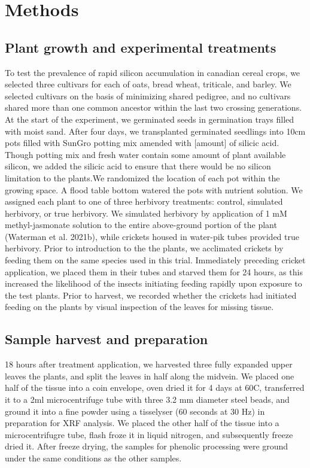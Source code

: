 \documentclass[12pt, letterpaper, ]{report}
\begin{document}
\section{Methods}

\subsection{Plant growth and experimental treatments}

To test the prevalence of rapid silicon accumulation in canadian cereal crops, we selected three cultivars for each of oats, bread wheat, triticale, and barley. We selected cultivars on the basis of minimizing shared pedigree, and no cultivars shared more than one common ancestor within the last two crossing generations. At the start of the experiment, we germinated seeds in germination trays filled with moist sand. After four days, we transplanted germinated seedlings into 10cm pots filled with SunGro potting mix amended with [amount] of silicic acid. Though potting mix and fresh water contain some amount of plant available silicon, we added the silicic acid to ensure that there would be no silicon limitation to the plants.We randomized the location of each pot within the growing space. A flood table bottom watered the pots with nutrient solution. We assigned each plant to one of three herbivory treatments: control, simulated herbivory, or true herbivory. We simulated herbivory by application of 1 mM methyl-jasmonate solution to the entire above-ground portion of the plant (Waterman et al. 2021b), while crickets housed in water-pik tubes provided true herbivory. Prior to introduction to the the plants, we acclimated crickets by feeding them on the same species used in this trial. Immediately preceding cricket application, we placed them in their tubes and starved them for 24 hours, as this increased the likelihood of the insects initiating feeding rapidly upon exposure to the test plants. Prior to harvest, we recorded whether the crickets had initiated feeding on the plants by visual inspection of the leaves for missing tissue. 

\subsection{Sample harvest and preparation}

18 hours after treatment application, we harvested three fully expanded upper leaves the plants, and split the leaves in half along the midvein. We placed one half of the tissue into a coin envelope, oven dried it for 4 days at 60\degree C, transferred it to a 2ml microcentrifuge tube with three 3.2 mm diameter steel beads, and ground it into a fine powder using a tisselyser (60 seconds at 30 Hz) in preparation for XRF analysis. We placed the other half of the tissue into a microcentrifugre tube, flash froze it in liquid nitrogen, and subsequently freeze dried it. After freeze drying, the samples for phenolic processing were ground under the same conditions as the other samples.
\end{document}
